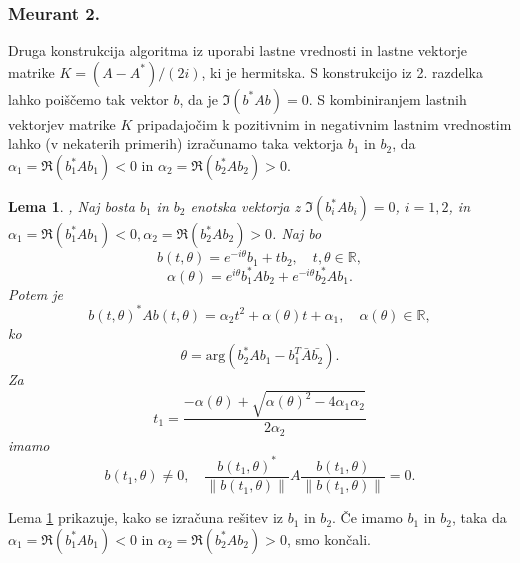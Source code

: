 \documentclass[12pt,a4paper]{amsart}
\theoremstyle{definition}
\theoremstyle{plain}
\newtheorem{lema}[definicija]{Lema}
\newcommand{\R}{\mathbb R}
\newcommand{\norm}[1]{\left\lVert#1\right\rVert}
\begin{document}
\subsubsection{Meurant 2.}\label{Meurant 2}
Druga konstrukcija algoritma iz \cite{meurant} uporabi lastne vrednosti in lastne vektorje matrike $K=(A-A^\ast)/(2i)$, ki je hermitska.
S konstrukcijo iz 2. razdelka lahko poiščemo tak vektor $b$, da je $\Im(b^\ast Ab)=0$. 
S kombiniranjem lastnih vektorjev matrike $K$ pripadajočim k pozitivnim in negativnim lastnim vrednostim lahko (v nekaterih primerih) izračunamo taka vektorja $b_1$ in $b_2$, da $\alpha_1=\Re(b_1^\ast Ab_1)<0$ in $\alpha_2=\Re(b_2^\ast Ab_2)>0$. 
\begin{lema}\label{komp}\cite{meurant},\cite{num}
Naj bosta $b_1$ in $b_2$ enotska vektorja z $\Im(b_i^\ast Ab_i)=0$, $i=1,2$, in $\alpha_1=\Re(b_1^\ast Ab_1)<0, \alpha_2=\Re(b_2^\ast Ab_2)>0$. Naj bo 
$$b(t,\theta)=e^{-i\theta}b_1 + tb_2, \quad t,\theta \in \R,$$ 
$$\alpha(\theta)=e^{i\theta}b_1^\ast Ab_2 +e^{-i\theta}b_2^\ast Ab_1.$$
Potem je 
$$b(t,\theta)^\ast Ab(t,\theta)=\alpha_2 t^2 +\alpha(\theta)t+\alpha_1,\quad \alpha(\theta)\in\R,$$ ko 
$$\theta= \text{arg}(b_2^\ast Ab_1 -b_1^T\bar{A}\bar{b_2}).$$ Za 
$$t_1 = \frac{-\alpha(\theta) + \sqrt{\alpha(\theta)^2 - 4\alpha_1 \alpha_2}}{2\alpha_2}$$ imamo 
$$b(t_1, \theta) \not=0,\quad  \frac{b(t_1,\theta)^\ast}{\norm{b(t_1,\theta)}}A\frac{b(t_1,\theta)}{\norm{b(t_1,\theta)}}=0.$$

\end{lema}
Lema \ref{komp} prikazuje, kako se izračuna rešitev iz $b_1$ in $b_2$. Če imamo $b_1$ in $b_2$, taka da  $\alpha_1=\Re(b_1^\ast Ab_1)<0$ in $\alpha_2=\Re(b_2^\ast Ab_2)>0$, smo končali.
\end{document}
